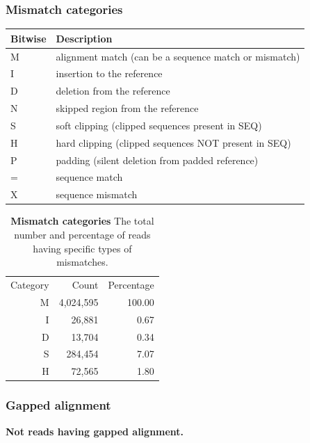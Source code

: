 \documentclass{article}
\begin{document}
\subsubsection{Mismatch categories}
\begin{center}
\begin{tabular}{ll}
  \hline
Bitwise & Description \\ 
  \hline
M & alignment match (can be a sequence match or mismatch) \\ 
  I & insertion to the reference \\ 
  D & deletion from the reference \\ 
  N & skipped region from the reference \\ 
  S & soft clipping (clipped sequences present in SEQ) \\ 
  H & hard clipping (clipped sequences NOT present in SEQ) \\ 
  P & padding (silent deletion from padded reference) \\ 
  = & sequence match \\ 
  X & sequence mismatch \\ 
   \hline
\end{tabular}\end{center}

\begin{table}
\begin{tabular}{|r|r|r|}
  \hline
Category & Count & Percentage \\ 
  \rowcolor[gray]{0.9} \hline
M & 4,024,595 & 100.00 \\ 
  I &    26,881 &   0.67 \\ 
   \rowcolor[gray]{0.9}D &    13,704 &   0.34 \\ 
  S &   284,454 &   7.07 \\ 
   \rowcolor[gray]{0.9}H &    72,565 &   1.80 \\ 
   \hline
\end{tabular}\caption{\textbf{Mismatch categories} The total number and percentage of reads having specific types of mismatches.}
\end{table}

\subsubsection{Gapped alignment}
\textbf{Not reads having gapped alignment.}
\end{document}
